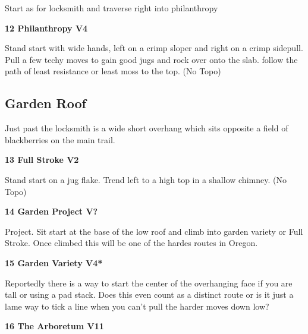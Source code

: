 \begin{multicols}{2}
\begin{adjustwidth}{0.5cm}{}
					\begin{adjustwidth}{0.5cm}{}				
					Start as for locksmith and traverse right into philanthropy
					\end{adjustwidth}
				\end{adjustwidth}
			\label{rt:Philanthropy}
\colorbox{RoyalBlue!20}{
\parbox{0.95\linewidth}{
\textbf{
12 Philanthropy V4  \warn\warn
}
}
}

			\begin{adjustwidth}{0.5cm}{}				
			Stand start with wide hands, left on a crimp sloper and right on a crimp sidepull. Pull a few techy moves to gain good jugs and rock over onto the slab. follow the path of least resistance or least moss to the top.
				\newline (No Topo) 
			\end{adjustwidth}
		\subsection*{Garden Roof}\label{bf:Garden Roof}
		Just past the locksmith is a wide short overhang which sits opposite a field of blackberries on the main trail.\\
	
			\label{rt:Full Stroke}
\colorbox{green!20}{
\parbox{0.95\linewidth}{
\textbf{
13 Full Stroke V2  \warn
}
}
}

			\begin{adjustwidth}{0.5cm}{}				
			Stand start on a jug flake. Trend left to a high top in a shallow chimney.
				\newline (No Topo) 
			\end{adjustwidth}
			\label{rt:Garden Project}
\colorbox{black!20}{
\parbox{0.95\linewidth}{
\textbf{
14 Garden Project V?  
}
}
}

			\begin{adjustwidth}{0.5cm}{}				
			Project. Sit start at the base of the low roof and climb into garden variety or Full Stroke. Once climbed this will be one of the hardes routes in Oregon.
			\end{adjustwidth}

			\label{rt:Garden Variety}
\colorbox{RoyalBlue!20}{
\parbox{0.95\linewidth}{
\textbf{
15 Garden Variety V4*  
}
}
}

			\begin{adjustwidth}{0.5cm}{}				
			Reportedly there is a way to start the center of the overhanging face if you are tall or using a pad stack. Does this even count as a distinct route or is it just a lame way to tick a line when you can't pull the harder moves down low?
			\end{adjustwidth}
			\label{rt:The Arboretum}
\colorbox{red!20}{
\parbox{0.95\linewidth}{
\textbf{
16 The Arboretum V11  
}
}
}


\end{multicols}
